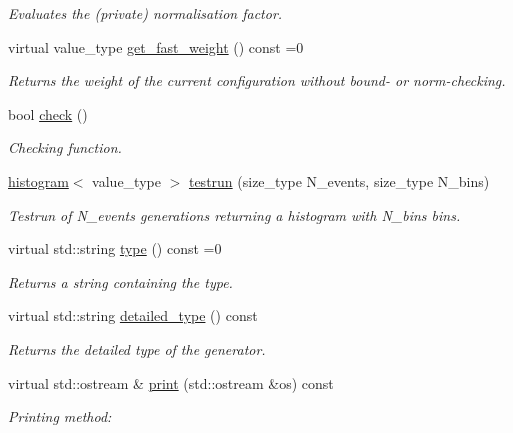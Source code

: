 \begin{DoxyCompactItemize}
\begin{DoxyCompactList}\small\item\em Evaluates the (private) normalisation factor. \end{DoxyCompactList}\item 
virtual value\+\_\+type \hyperlink{a00577_a4af6e06d81d2326b48ca2b792c0a4bdb}{get\+\_\+fast\+\_\+weight} () const =0
\begin{DoxyCompactList}\small\item\em Returns the weight of the current configuration without bound-\/ or norm-\/checking. \end{DoxyCompactList}\item 
\hypertarget{a00577_aa7d9af53b400cb6e51ba01ecc08cb2c9}{}bool \hyperlink{a00577_aa7d9af53b400cb6e51ba01ecc08cb2c9}{check} ()\label{a00577_aa7d9af53b400cb6e51ba01ecc08cb2c9}

\begin{DoxyCompactList}\small\item\em Checking function. \end{DoxyCompactList}\item 
\hyperlink{a00284}{histogram}$<$ value\+\_\+type $>$ \hyperlink{a00577_a3e35d4b097cca97a61280c698d3a8a12}{testrun} (size\+\_\+type N\+\_\+events, size\+\_\+type N\+\_\+bins)
\begin{DoxyCompactList}\small\item\em Testrun of N\+\_\+events generations returning a histogram with N\+\_\+bins bins. \end{DoxyCompactList}\item 
\hypertarget{a00577_aadd89058cfaaca8b2587b0351fa5e583}{}virtual std\+::string \hyperlink{a00577_aadd89058cfaaca8b2587b0351fa5e583}{type} () const =0\label{a00577_aadd89058cfaaca8b2587b0351fa5e583}

\begin{DoxyCompactList}\small\item\em Returns a string containing the type. \end{DoxyCompactList}\item 
\hypertarget{a00577_a4737b3170d8e655e501dd9c612c59ee2}{}virtual std\+::string \hyperlink{a00577_a4737b3170d8e655e501dd9c612c59ee2}{detailed\+\_\+type} () const \label{a00577_a4737b3170d8e655e501dd9c612c59ee2}

\begin{DoxyCompactList}\small\item\em Returns the detailed type of the generator. \end{DoxyCompactList}\item 
\hypertarget{a00577_a4979e74f683cd25b4da4677b70e20b21}{}virtual std\+::ostream \& \hyperlink{a00577_a4979e74f683cd25b4da4677b70e20b21}{print} (std\+::ostream \&os) const \label{a00577_a4979e74f683cd25b4da4677b70e20b21}

\begin{DoxyCompactList}\small\item\em Printing method\+: \end{DoxyCompactList}\end{DoxyCompactItemize}
